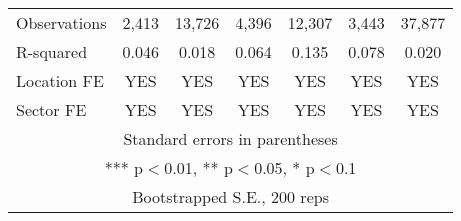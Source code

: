 \documentclass[]{article}
\begin{document}
\begin{tabular}{lcccccc}
Observations & 2,413 & 13,726 & 4,396 & 12,307 & 3,443 & 37,877 \\
R-squared & 0.046 & 0.018 & 0.064 & 0.135 & 0.078 & 0.020 \\
Location FE & YES & YES & YES & YES & YES & YES \\
 Sector FE & YES & YES & YES & YES & YES & YES \\ \hline
\multicolumn{7}{c}{ Standard errors in parentheses} \\
\multicolumn{7}{c}{ *** p$<$0.01, ** p$<$0.05, * p$<$0.1} \\
\multicolumn{7}{c}{ Bootstrapped S.E., 200 reps} \\
\end{tabular}
\end{document}
